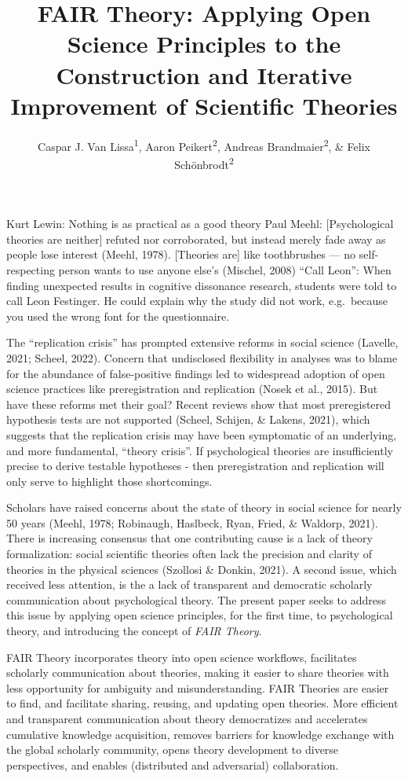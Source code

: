 \documentclass[
  man]{apa6}
\title{FAIR Theory: Applying Open Science Principles to the Construction and Iterative Improvement of Scientific Theories}
\author{Caspar J. Van Lissa\textsuperscript{1}, Aaron Peikert\textsuperscript{2}, Andreas Brandmaier\textsuperscript{2}, \& Felix Schönbrodt\textsuperscript{2}}
\date{}
\affiliation{\vspace{0.5cm}\textsuperscript{1} Tilburg University, dept. Methodology \& Statistics\\\textsuperscript{2} Other affiliations}
\begin{document}
\maketitle

Kurt Lewin: Nothing is as practical as a good theory
Paul Meehl: {[}Psychological theories are neither{]} refuted nor corroborated, but instead merely fade away as people lose interest (Meehl, 1978).
{[}Theories are{]} like toothbrushes --- no self-respecting person wants to use anyone else's (Mischel, 2008)
``Call Leon'': When finding unexpected results in cognitive dissonance research, students were told to call Leon Festinger. He could explain why the study did not work, e.g.~because you used the wrong font for the questionnaire.

The ``replication crisis'' has prompted extensive reforms in social science (Lavelle, 2021; Scheel, 2022).
Concern that undisclosed flexibility in analyses was to blame for the abundance of false-positive findings led to widespread adoption of open science practices like preregistration and replication (Nosek et al., 2015).
But have these reforms met their goal?
Recent reviews show that most preregistered hypothesis tests are not supported (Scheel, Schijen, \& Lakens, 2021),
which suggests that the replication crisis may have been symptomatic of an underlying, and more fundamental, ``theory crisis''.
If psychological theories are insufficiently precise to derive testable hypotheses - then preregistration and replication will only serve to highlight those shortcomings.

Scholars have raised concerns about the state of theory in social science for nearly 50 years (Meehl, 1978; Robinaugh, Haslbeck, Ryan, Fried, \& Waldorp, 2021).
There is increasing consensus that one contributing cause is a lack of theory formalization: social scientific theories often lack the precision and clarity of theories in the physical sciences (Szollosi \& Donkin, 2021).
A second issue, which received less attention, is the a lack of transparent and democratic scholarly communication about psychological theory.
The present paper seeks to address this issue by applying open science principles, for the first time, to psychological theory, and introducing the concept of \emph{FAIR Theory}.

FAIR Theory incorporates theory into open science workflows,
facilitates scholarly communication about theories,
making it easier to share theories with less opportunity for ambiguity and misunderstanding.
FAIR Theories are easier to find, and facilitate sharing, reusing, and updating open theories.
More efficient and transparent communication about theory democratizes and accelerates cumulative knowledge acquisition,
removes barriers for knowledge exchange with the global scholarly community,
opens theory development to diverse perspectives, and enables (distributed and adversarial) collaboration.
\end{document}
